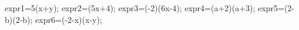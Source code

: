 \documentclass[exercice]{thedocument}%
\begin{document}
%
    \>expr1=5(x+y);%
    \>expr2=(5x+4);%
    \>expr3=(-2)\times(6x-4);%
    \>expr4=(a+2)(a+3);%
    \>expr5=(2-b)(2-b);%
    \>expr6=(-2-x)(x-y);%
\end{document}
